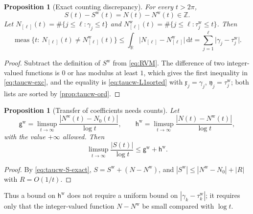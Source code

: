 \documentclass[11pt,a4paper]{article}
\numberwithin{equation}{section}
\newtheorem{proposition}[theorem]{Proposition}
\theoremstyle{definition}
\theoremstyle{remark}
\newcommand{\meas}{\operatorname{meas}}
\newcommand{\dd}{\,\mathrm dt}
\begin{document}
\begin{proposition}[Exact counting discrepancy]\label{prop:taucw-S}
For every $t>2\pi$,
\begin{equation}\label{eq:taucw-S-exact}
S(t)-S^{\mathrm w}(t)=N(t)-N^{\mathrm w}(t)\in\mathbb Z .
\end{equation}
Let $N_{[\ell]}(t)=\#\{j\le\ell:\gamma_j\le t\}$ and $N^{\mathrm w}_{[\ell]}(t)=\#\{j\le\ell:\tau_j^{\mathrm w}\le t\}$. Then
\begin{equation}\label{eq:taucw-exc}
\meas\{t:\ N_{[\ell]}(t)\ne N^{\mathrm w}_{[\ell]}(t)\}\le\int_{\mathbb R}\bigl|N_{[\ell]}-N^{\mathrm w}_{[\ell]}\bigr|\dd=\sum_{j=1}^\ell\bigl|\gamma_j-\tau_j^{\mathrm w}\bigr| .
\end{equation}
\end{proposition}
\begin{proof}
Subtract the definition of $S^{\mathrm w}$ from \eqref{eq:RVM}. The difference of two integer-valued functions is $0$ or has modulus at least $1$, which gives the first inequality in \eqref{eq:taucw-exc}, and the equality is \eqref{eq:taucw-L1sorted} with $\mathfrak x_j=\gamma_j$, $\mathfrak y_j=\tau_j^{\mathrm w}$; both lists are sorted by \cref{prop:taucw-ord}.
\end{proof}

\begin{proposition}[Transfer of coefficients needs counts]\label{prop:taucw-transfer}
Let
\begin{equation}\label{eq:taucw-gh}
\mathsf g^{\mathrm w}=\limsup_{t\to\infty}\frac{|N^{\mathrm w}(t)-N_0(t)|}{\log t},\qquad
\mathsf h^{\mathrm w}=\limsup_{t\to\infty}\frac{|N(t)-N^{\mathrm w}(t)|}{\log t},
\end{equation}
with the value $+\infty$ allowed. Then
\begin{equation}\label{eq:taucw-transfer}
\limsup_{t\to\infty}\frac{|S(t)|}{\log t}\le\mathsf g^{\mathrm w}+\mathsf h^{\mathrm w}.
\end{equation}
\end{proposition}
\begin{proof}
By \eqref{eq:taucw-S-exact}, $S=S^{\mathrm w}+(N-N^{\mathrm w})$, and $|S^{\mathrm w}|\le|N^{\mathrm w}-N_0|+|R|$ with $R=O(1/t)$.
\end{proof}
Thus a bound on $\mathsf h^{\mathrm w}$ does not require a uniform bound on $|\gamma_k-\tau_k^{\mathrm w}|$; it requires only that the integer-valued function $N-N^{\mathrm w}$ be small compared with $\log t$.
\end{document}
